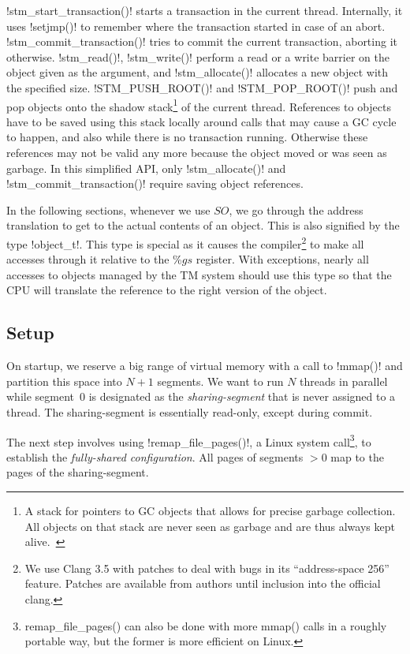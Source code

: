 \documentclass{sigplanconf}
\makeatletter
\renewcommand\lstinline[1][]{%
  \Collectverb{\@@myverb}%
}
\def\@@myverb#1{%
    \begingroup
    \fboxsep=0.2em
    \colorbox{verylightgray}{\oldlstinline|#1|}%
    \endgroup
}
\makeatother
\begin{document}
\lstinline!stm_start_transaction()!  starts a transaction in the
current thread. Internally, it uses \lstinline!setjmp()! to remember
where the transaction started in case of an abort.
\lstinline!stm_commit_transaction()! tries to commit the current
transaction, aborting it otherwise. \lstinline!stm_read()!,
\lstinline!stm_write()!  perform
a read or a write barrier on the object given as the argument, and
\lstinline!stm_allocate()!  allocates a new object with the specified
size.  \lstinline!STM_PUSH_ROOT()! and \lstinline!STM_POP_ROOT()!
push and pop objects onto the shadow stack\footnote{A stack for pointers
  to GC objects that allows for precise garbage collection. All objects
  on that stack are never seen as garbage and are thus always kept
  alive.~\cite{fergus02}} of the current thread.  References to objects
have to be saved using this stack locally around calls that may cause a GC
cycle to happen, and also while there is no transaction
running. Otherwise these references may not be valid any more because
the object moved or was seen as garbage. In this simplified API, only
\lstinline!stm_allocate()!  and \lstinline!stm_commit_transaction()!
require saving object references.

In the following sections, whenever we use $SO$, we go through the
address translation to get to the actual contents of an object. This
is also signified by the type \lstinline!object_t!.  This type is
special as it causes the
compiler\footnote{We use Clang 3.5 with patches to deal with bugs in
its ``address-space 256'' feature. Patches are available from authors
until inclusion into the official clang.} to make all accesses through
it relative to the $\%gs$ register.  With exceptions, nearly all
accesses to objects managed by the TM system should use this type so
that the CPU will translate the reference to the right version of the
object.


\medskip   %
\subsection{Setup\label{sub:Setup}}

On startup, we reserve a big range of virtual memory with a call to
\lstinline!mmap()! and partition this space into $N+1$ segments. We
want to run $N$ threads in parallel while segment~0 is designated as
the \emph{sharing-segment} that is never assigned to a thread. The
sharing-segment is essentially read-only, except during commit.

The next step involves using \lstinline!remap_file_pages()!, a Linux
system call\footnote{remap\_file\_pages() can also be done with more mmap()
calls in a roughly portable way, but the former is more efficient on Linux.},
to establish the \emph{fully-shared configuration}.  All pages
of segments $>0$ map to the pages of the sharing-segment.
\end{document}
